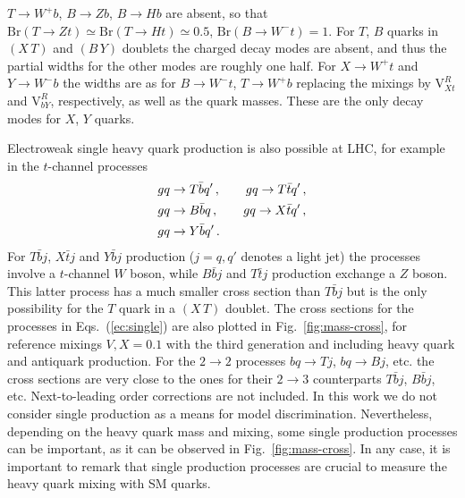 \documentclass[12pt,a4paper]{article}
\newcommand{\XT}{(X \, T)}
\newcommand{\BY}{(B \, Y)}
\begin{document}
$T \to W^+ b$, $B \to Zb$, $B \to Hb$ are absent, so that $\mathrm{Br}(T \to Zt) \simeq \mathrm{Br}(T \to Ht) \simeq 0.5$, $\mathrm{Br}(B \to W^- t) = 1$.
For $T$, $B$ quarks in $\XT$ and $\BY$ doublets the charged decay modes are absent, and thus the partial widths for the other modes are roughly one half. For $X \to W^+ t$ and $Y \to W^- b$ the widths are as for $B \to W^- t$, $T \to W^+ b$ replacing the mixings by $\mathrm{V}_{Xt}^R$ and $\mathrm{V}_{bY}^R$, respectively, as well as the quark masses. These are the only decay modes for $X$, $Y$ quarks.

Electroweak single heavy quark production is also possible at LHC, for example in the $t$-channel processes
\begin{align}
& gq \to T \bar b q' \,, \quad\quad gq \to T \bar t q' \,,  \notag \\
& gq \to B \bar b q \,, \quad\quad  gq \to X \bar t q' \,,  \notag \\
& gq \to Y \bar b q' \,.
\label{ec:single}
\end{align}
For $T \bar b j$, $X \bar t j$ and $Y \bar b j$ production ($j=q,q'$ denotes a light jet) the processes involve a $t$-channel $W$ boson, while $B \bar b j$ and $T \bar t j$ production exchange a $Z$ boson. This latter process has a much smaller cross section than $T \bar b j$ but is the only possibility for the $T$ quark in a $\XT$ doublet. 
The cross sections for the processes in Eqs.~(\ref{ec:single}) are also plotted in Fig.~\ref{fig:mass-cross}, for reference mixings $V,X=0.1$ with the third generation and including heavy quark and antiquark production. For the $2 \to 2$ processes $bq \to Tj$, $bq \to Bj$, etc. the cross sections are very close to the ones for their $2 \to 3$ counterparts $T \bar bj$, $B \bar bj$, etc.
Next-to-leading order corrections \cite{Campbell:2009gj,Berger:2009qy} are not included.
In this work we do not consider single production as a means for model discrimination.
Nevertheless, depending on the heavy quark mass and mixing, some single production processes can be important, as it can be observed in Fig.~\ref{fig:mass-cross}.
In any case, it is important to remark that single production processes are crucial to 
measure the heavy quark mixing with SM quarks.
\end{document}
